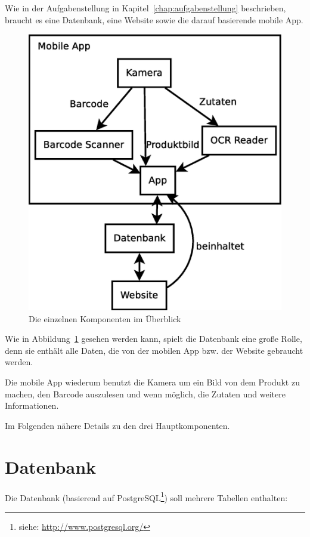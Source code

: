 \documentclass[a4paper]{report}
\begin{document}
Wie in der Aufgabenstellung in Kapitel~\ref{chap:aufgabenstellung} beschrieben, braucht es eine
Datenbank, eine Website sowie die darauf basierende mobile App.

\begin{figure}[ht]
	\centerline{\includegraphics[scale=0.5]{usage_graph.eps}}
	\caption{Die einzelnen Komponenten im Überblick}
	\label{img:usage_graph}
\end{figure}

Wie in Abbildung~\ref{img:usage_graph} gesehen werden kann, spielt die
Datenbank eine große Rolle, denn sie enthält alle Daten, die von der
mobilen App bzw. der Website gebraucht werden.

Die mobile App wiederum benutzt die Kamera um ein Bild von dem Produkt
zu machen, den Barcode auszulesen und wenn möglich, die
Zutaten und weitere Informationen.

Im Folgenden nähere Details zu den drei Hauptkomponenten.

\section{Datenbank}

Die Datenbank (basierend auf
PostgreSQL\footnote{siehe: \url{http://www.postgresql.org/}}) soll 
mehrere Tabellen enthalten:
\end{document}

